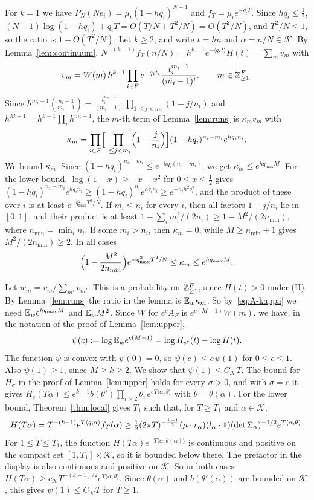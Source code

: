 For $k=1$ we have $P_N(Ne_i)=\mu_i(1-hq_i)^{N-1}$ and $f_T=\mu_ie^{-q_iT}$.
Since $hq_i\le\frac12$, $(N-1)\log(1-hq_i)+q_iT=O(T/N+T^2/N)=O(T^2/N)$, and
$T^2/N\le1$, so the ratio is $1+O(T^2/N)$. Let
$k\ge2$, and write $t=hn$ and $\alpha=n/N\in\mathcal K$. By
Lemma~\ref{lem:continuum},
$N^{-(k-1)}f_T(n/N)=h^{k-1}e^{-\langle q,t\rangle}H(t)=\sum_mv_m$ with
\[
v_m=W(m)\,h^{k-1}\prod_{i\in F}e^{-q_it_i}\frac{t_i^{m_i-1}}{(m_i-1)!},
\qquad m\in\mathbb{Z}_{\ge1}^F .
\]
Since $h^{m_i-1}\binom{n_i-1}{m_i-1}=\frac{t_i^{m_i-1}}{(m_i-1)!}\prod_{1\le j<m_i}(1-j/n_i)$
and $h^{M-1}=h^{k-1}\prod_ih^{m_i-1}$, the $m$-th term of
Lemma~\ref{lem:runs} is $\kappa_mv_m$ with
\[
\kappa_m=\prod_{i\in F}\Bigl[\prod_{1\le j<m_i}\Bigl(1-\frac j{n_i}\Bigr)\Bigr]
(1-hq_i)^{n_i-m_i}e^{hq_in_i}.
\]
We bound $\kappa_m$. Since $(1-hq_i)^{n_i-m_i}\le e^{-hq_i(n_i-m_i)}$, we
get $\kappa_m\le e^{hq_{\max}M}$. For the lower bound,
$\log(1-x)\ge-x-x^2$ for $0\le x\le\frac12$ gives
$(1-hq_i)^{n_i-m_i}e^{hq_in_i}\ge(1-hq_i)^{n_i}e^{hq_in_i}\ge e^{-n_ih^2q_i^2}$,
and the product of these over $i$ is at least $e^{-q_{\max}^2T^2/N}$. If
$m_i\le n_i$ for every $i$, then all factors $1-j/n_i$ lie in $[0,1]$, and
their product is at least
$1-\sum_im_i^2/(2n_i)\ge1-M^2/(2n_{\min})$, where $n_{\min}=\min_in_i$. If
some $m_i>n_i$, then $\kappa_m=0$, while $M\ge n_{\min}+1$ gives
$M^2/(2n_{\min})\ge2$. In all cases
\begin{equation}\label{eq:A-kappa}
\Bigl(1-\frac{M^2}{2n_{\min}}\Bigr)e^{-q_{\max}^2T^2/N}\le\kappa_m\le e^{hq_{\max}M}.
\end{equation}

Let $w_m=v_m/\sum_{m'}v_{m'}$. This is a probability on $\mathbb{Z}^F_{\ge1}$,
since $H(t)>0$ under \textup{(H)}. By Lemma~\ref{lem:runs} the ratio in the
lemma is $\mathbb{E}_w\kappa_m$. So by~\eqref{eq:A-kappa} we need
$\mathbb{E}_we^{hq_{\max}M}$ and $\mathbb{E}_wM^2$. Since $W$ for $e^cA_F$ is
$e^{c(M-1)}W(m)$, we have, in the notation of the proof of
Lemma~\ref{lem:upper},
\[
\psi(c):=\log\mathbb{E}_we^{c(M-1)}=\log H_{e^c}(t)-\log H(t).
\]
The function $\psi$ is convex with $\psi(0)=0$, so $\psi(c)\le c\,\psi(1)$
for $0\le c\le1$. Also $\psi(1)\ge1$, since $M\ge k\ge2$. We show that
$\psi(1)\le C_{\mathcal K}T$. The bound for $H_\sigma$ in the proof of
Lemma~\ref{lem:upper} holds for every $\sigma>0$, and with $\sigma=e$ it
gives
$H_e(T\alpha)\le e^{k-1}b(\theta')\prod_{i\ge2}\theta_i\,e^{eT\langle\alpha,\theta\rangle}$
with $\theta=\theta(\alpha)$. For the lower bound, Theorem~\ref{thm:local}
gives $T_1$ such that, for $T\ge T_1$ and $\alpha\in\mathcal K$,
\[
H(T\alpha)=T^{-(k-1)}e^{T\langle q,\alpha\rangle}f_T(\alpha)
\ge\tfrac12(2\pi T)^{-\frac{k-1}2}(\mu\cdot r_\alpha)(l_\alpha\cdot\mathbf{1})
(\det\Sigma_\alpha)^{-1/2}e^{T\langle\alpha,\theta\rangle}.
\]
For $1\le T\le T_1$, the function $H(T\alpha)e^{-T\langle\alpha,\theta(\alpha)\rangle}$
is continuous and positive on the compact set $[1,T_1]\times\mathcal K$, so
it is bounded below there. The prefactor in the display is also continuous
and positive on $\mathcal K$. So in both cases
$H(T\alpha)\ge c_{\mathcal K}T^{-(k-1)/2}e^{T\langle\alpha,\theta\rangle}$.
Since $\theta(\alpha)$ and $b(\theta'(\alpha))$ are bounded on $\mathcal K$,
this gives $\psi(1)\le C_{\mathcal K}T$ for $T\ge1$.

